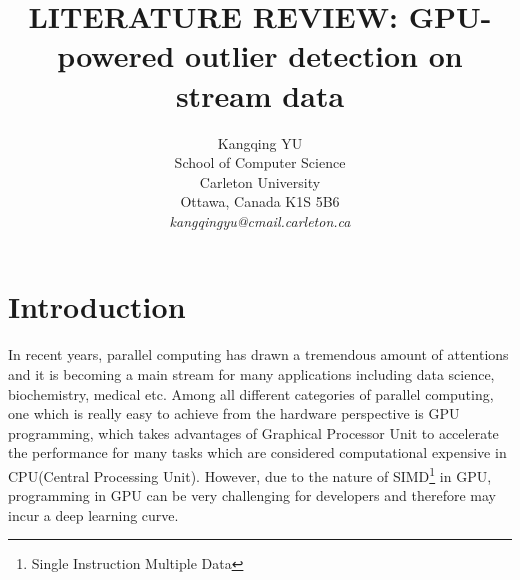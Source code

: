 \documentclass[11pt]{article}       %
\begin{document}


\title{LITERATURE REVIEW: GPU-powered outlier detection on stream data}


\author{
Kangqing YU\\
School of Computer Science\\
Carleton University\\
Ottawa, Canada K1S 5B6\\
{\em kangqingyu@cmail.carleton.ca}
} %

\maketitle



\section{Introduction} \label{intro}

In recent years, parallel computing has drawn a tremendous amount of attentions and it is becoming a main stream for many applications including data science, biochemistry, medical etc. Among all different categories of parallel computing, one which is really easy to achieve from the hardware perspective is GPU programming, which takes advantages of Graphical Processor Unit to accelerate the performance for many tasks which are considered computational expensive in CPU(Central Processing Unit). However, due to the nature of SIMD\footnote{Single Instruction Multiple Data} in GPU, programming in GPU can be very challenging for developers and therefore may incur a deep learning curve. 
\end{document}
